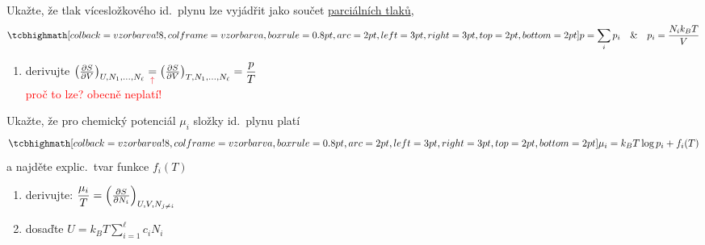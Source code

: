 \begin{priklad}[Příklad 5]
Ukažte, že tlak vícesložkového id.\ plynu lze vyjádřit jako součet \underline{parciálních tlaků},
\[ \vzorec{p = \sum_i p_i} \quad \& \quad p_i = \frac{N_ik_BT}{V} \]
\end{priklad}
\begin{enumerate}[label=\arabic*),font=\color{NavyBlue}]\color{NavyBlue}
  \item derivujte \quad $\left(\pdv{S}{V}\right)_{U,N_1,\dots,N_\ell} \underset{\textcolor{Red}{\uparrow}}{=} \left(\pdv{S}{V}\right)_{T,N_1,\dots,N_\ell} = \dfrac{p}{T}$ \\
  \hspace*{4.2cm}\textcolor{Red}{proč to lze? obecně neplatí!}
\end{enumerate}

\begin{priklad}[Příklad 6]
Ukažte, že pro chemický potenciál $\mu_i$ složky id.\ plynu platí
\[ \vzorec{\mu_i = k_BT\log p_i + f_i(T)} \]
a najděte explic.\ tvar funkce $f_i(T)$
\end{priklad}
\begin{enumerate}[label=\arabic*),font=\color{NavyBlue}]\color{NavyBlue}
  \item derivujte: \quad $\dfrac{\mu_i}{T} = \left(\pdv{S}{N_i}\right)_{U,V,N_{j\neq i}}$
  \item dosaďte \quad $U = k_BT\sum_{i=1}^{\ell} c_iN_i$
\end{enumerate}

